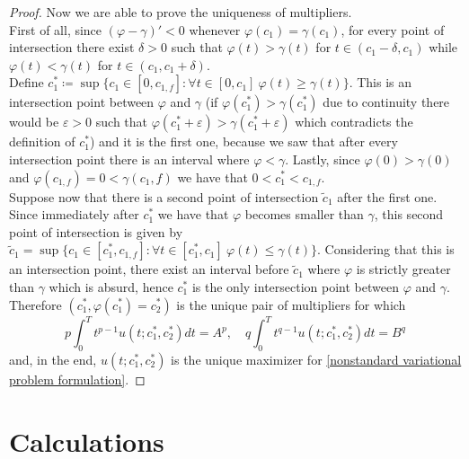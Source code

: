 \documentclass[corpo=11pt, stile=classica, tipotesi=custom,
greek, evenboxes, english]{toptesi}
\numberwithin{equation}{chapter}
\theoremstyle{remark}
\begin{document}
\begin{proof}
Now we are able to prove the uniqueness of multipliers.\\
First of all, since $(\varphi-\gamma)'<0$ whenever $\varphi(c_1) = \gamma(c_1)$, for every point of intersection there exist $\delta>0$ such that $\varphi(t) > \gamma(t)$ for $t \in (c_1 - \delta, c_1)$ while $\varphi(t) < \gamma(t)$ for $t \in (c_1, c_1 + \delta)$.\\
Define $c_1^* \coloneqq \sup \{c_1 \in [0,c_{1,f}] : \forall t \in [0,c_1] \ \varphi(t) \geq \gamma(t)\}$. This is an intersection point between $\varphi$ and $\gamma$ (if $\varphi(c_1^*) > \gamma(c_1^*)$ due to continuity there would be $\varepsilon > 0$ such that $\varphi(c_1^*+\varepsilon) > \gamma(c_1^*+\varepsilon)$ which contradicts the definition of $c_1^*$) and it is the first one, because we saw that after every intersection point there is an interval where $\varphi < \gamma$. Lastly, since $\varphi(0) > \gamma(0)$ and $\varphi(c_{1,f}) = 0 < \gamma(c_1,f)$ we have that $0 < c_1^* < c_{1,f}$.\\
Suppose now that there is a second point of intersection $\tilde{c}_1$ after the first one. Since immediately after $c_1^*$ we have that $\varphi$ becomes smaller than $\gamma$, this second point of intersection is given by $\tilde{c}_1 = \sup \{c_1 \in [c_1^*,c_{1,f}] : \forall t \in [c_1^*,c_1] \ \varphi(t) \leq \gamma(t)\}$. Considering that this is an intersection point, there exist an interval before $\tilde{c}_1$ where $\varphi$ is strictly greater than $\gamma$ which is absurd, hence $c_1^*$ is the only intersection point between $\varphi$ and $\gamma$.\\
Therefore $(c_1^*, \varphi(c_1^*) = c_2^*)$ is the unique pair of multipliers for which 
\begin{equation*}
	p\int_0^T t^{p-1} u(t;c_1^*,c_2^*)dt = A^p, \quad q\int_0^T t^{q-1} u(t;c_1^*,c_2^*)dt = B^q
\end{equation*}
and, in the end, $u(t;c_1^*,c_2^*)$ is the unique maximizer for \eqref{nonstandard variational problem formulation}.
\end{proof}

\appendix

\chapter{Calculations}
\end{document}
